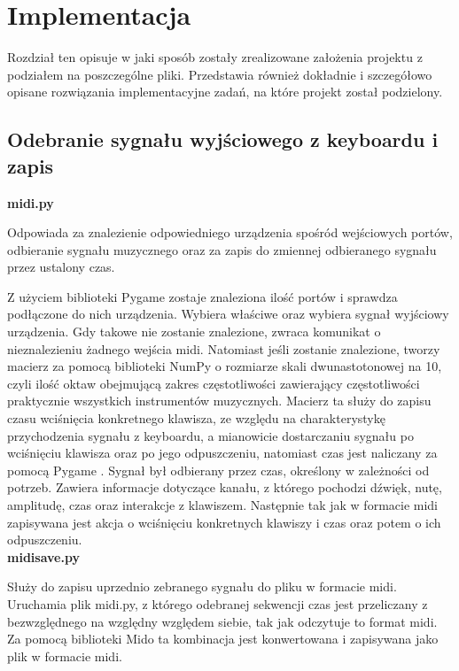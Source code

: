 \chapter{Implementacja}
\vspace{-20pt}

Rozdział ten opisuje w jaki sposób zostały zrealizowane założenia projektu z podziałem na poszczególne pliki. Przedstawia również dokładnie i szczegółowo opisane rozwiązania implementacyjne zadań, na które projekt został podzielony.

\section{Odebranie sygnału wyjściowego z keyboardu i zapis}

\noindent\textbf{midi.py}

Odpowiada za znalezienie odpowiedniego urządzenia spośród wejściowych portów, odbieranie sygnału muzycznego oraz za zapis do zmiennej odbieranego sygnału przez ustalony czas.

Z użyciem biblioteki Pygame \cite{pygame} zostaje znaleziona ilość portów i sprawdza podłączone do nich urządzenia. Wybiera właściwe oraz wybiera sygnał wyjściowy urządzenia. Gdy takowe nie zostanie znalezione, zwraca komunikat o nieznalezieniu żadnego wejścia midi. Natomiast jeśli zostanie znalezione, tworzy macierz za pomocą biblioteki NumPy \cite{numpy} o rozmiarze skali dwunastotonowej na 10, czyli ilość oktaw obejmującą zakres częstotliwości zawierający częstotliwości praktycznie wszystkich instrumentów muzycznych. Macierz ta służy do zapisu czasu wciśnięcia konkretnego klawisza, ze względu na charakterystykę przychodzenia sygnału z keyboardu, a mianowicie dostarczaniu sygnału po wciśnięciu klawisza oraz po jego odpuszczeniu, natomiast czas jest naliczany za pomocą Pygame \cite{pygame}. Sygnał był odbierany przez czas, określony w zależności od potrzeb. Zawiera informacje dotyczące kanału, z którego pochodzi dźwięk, nutę, amplitudę, czas oraz interakcje z klawiszem. Następnie tak jak w formacie midi zapisywana jest akcja o wciśnięciu konkretnych klawiszy i czas oraz potem o ich odpuszczeniu.\\

\noindent\textbf{midisave.py}

Służy do zapisu uprzednio zebranego sygnału do pliku w formacie midi.
Uruchamia plik midi.py, z którego odebranej sekwencji czas jest przeliczany z bezwzględnego na względny względem siebie, tak jak odczytuje to format midi. Za pomocą biblioteki Mido \cite{mido} ta kombinacja jest konwertowana i zapisywana jako plik w formacie midi.\\

